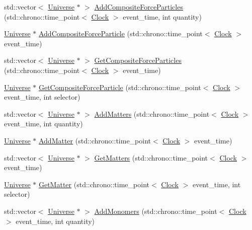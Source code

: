 \begin{DoxyCompactItemize}
\item 
std\+::vector$<$ \hyperlink{class_universe}{Universe} $\ast$ $>$ \hyperlink{class_universe_a23d74e377203fca7cb74e0ffee7244b6}{Add\+Composite\+Force\+Particles} (std\+::chrono\+::time\+\_\+point$<$ \hyperlink{universe_8h_a0ef8d951d1ca5ab3cfaf7ab4c7a6fd80}{Clock} $>$ event\+\_\+time, int quantity)
\item 
\hyperlink{class_universe}{Universe} $\ast$ \hyperlink{class_universe_ab2671c2218c98f0f1f487c5b3bb96e3c}{Add\+Composite\+Force\+Particle} (std\+::chrono\+::time\+\_\+point$<$ \hyperlink{universe_8h_a0ef8d951d1ca5ab3cfaf7ab4c7a6fd80}{Clock} $>$ event\+\_\+time)
\item 
std\+::vector$<$ \hyperlink{class_universe}{Universe} $\ast$ $>$ \hyperlink{class_universe_aed37d7224b4e31bdfb0632e39bf19694}{Get\+Composite\+Force\+Particles} (std\+::chrono\+::time\+\_\+point$<$ \hyperlink{universe_8h_a0ef8d951d1ca5ab3cfaf7ab4c7a6fd80}{Clock} $>$ event\+\_\+time)
\item 
\hyperlink{class_universe}{Universe} $\ast$ \hyperlink{class_universe_a3e2acc1d75765a6e8e852fca919c5b96}{Get\+Composite\+Force\+Particle} (std\+::chrono\+::time\+\_\+point$<$ \hyperlink{universe_8h_a0ef8d951d1ca5ab3cfaf7ab4c7a6fd80}{Clock} $>$ event\+\_\+time, int selector)
\item 
std\+::vector$<$ \hyperlink{class_universe}{Universe} $\ast$ $>$ \hyperlink{class_universe_ae00d10b2a23c9cedf1ff89e9da875563}{Add\+Matters} (std\+::chrono\+::time\+\_\+point$<$ \hyperlink{universe_8h_a0ef8d951d1ca5ab3cfaf7ab4c7a6fd80}{Clock} $>$ event\+\_\+time, int quantity)
\item 
\hyperlink{class_universe}{Universe} $\ast$ \hyperlink{class_universe_a090d9ad1b88d81364e872e17d65edca4}{Add\+Matter} (std\+::chrono\+::time\+\_\+point$<$ \hyperlink{universe_8h_a0ef8d951d1ca5ab3cfaf7ab4c7a6fd80}{Clock} $>$ event\+\_\+time)
\item 
std\+::vector$<$ \hyperlink{class_universe}{Universe} $\ast$ $>$ \hyperlink{class_universe_a4307a62e183fed8cf2b92be0f6014688}{Get\+Matters} (std\+::chrono\+::time\+\_\+point$<$ \hyperlink{universe_8h_a0ef8d951d1ca5ab3cfaf7ab4c7a6fd80}{Clock} $>$ event\+\_\+time)
\item 
\hyperlink{class_universe}{Universe} $\ast$ \hyperlink{class_universe_a69de663cf2e32e65ed28c44ae666db3a}{Get\+Matter} (std\+::chrono\+::time\+\_\+point$<$ \hyperlink{universe_8h_a0ef8d951d1ca5ab3cfaf7ab4c7a6fd80}{Clock} $>$ event\+\_\+time, int selector)
\item 
std\+::vector$<$ \hyperlink{class_universe}{Universe} $\ast$ $>$ \hyperlink{class_universe_a95fe7f99971bb2048121a7c4e87b9f79}{Add\+Monomers} (std\+::chrono\+::time\+\_\+point$<$ \hyperlink{universe_8h_a0ef8d951d1ca5ab3cfaf7ab4c7a6fd80}{Clock} $>$ event\+\_\+time, int quantity)

\end{DoxyCompactItemize}
